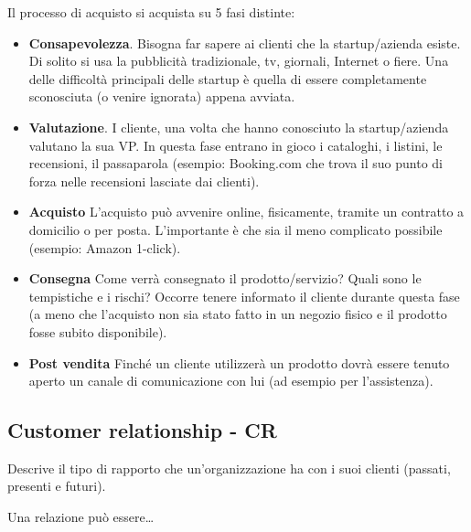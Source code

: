 Il processo di acquisto si acquista su 5 fasi distinte:

\begin{itemize}

\item \textbf{Consapevolezza}. Bisogna far sapere ai clienti che la
startup/azienda esiste. Di solito si usa la pubblicità tradizionale, tv,
giornali, Internet o fiere. Una delle difficoltà principali delle startup
è quella di essere completamente sconosciuta (o venire ignorata) appena
avviata.

\item \textbf{Valutazione}. I cliente, una volta che hanno conosciuto la
startup/azienda valutano la sua VP. In questa fase entrano in gioco i
cataloghi, i listini, le recensioni, il passaparola (esempio: Booking.com
che trova il suo punto di forza nelle recensioni lasciate dai clienti).

\item \textbf{Acquisto} L'acquisto può avvenire online, fisicamente, tramite
un contratto a domicilio o per posta. L'importante è che sia il meno complicato
possibile (esempio: Amazon 1-click).

\item \textbf{Consegna} Come verrà consegnato il prodotto/servizio? Quali sono
le tempistiche e i rischi? Occorre tenere informato il cliente durante questa
fase (a meno che l'acquisto non sia stato fatto in un negozio fisico e il
prodotto fosse subito disponibile).

\item \textbf{Post vendita} Finché un cliente utilizzerà un prodotto dovrà
essere tenuto aperto un canale di comunicazione con lui (ad esempio per
l'assistenza).

\end{itemize}

\subsection{Customer relationship - CR}

Descrive il tipo di rapporto che un'organizzazione ha con i suoi clienti
(passati, presenti e futuri).

Una relazione può essere\dots

